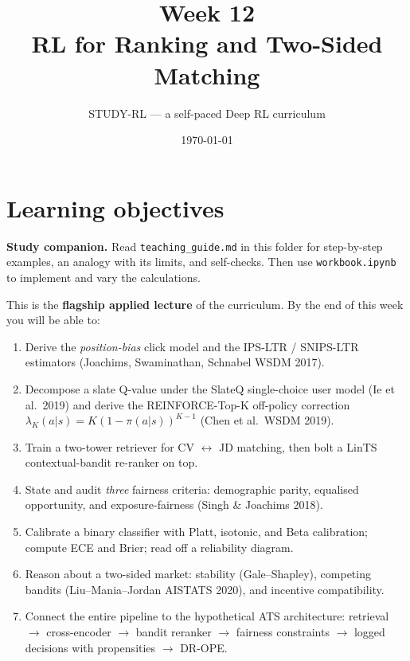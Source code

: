 \documentclass[11pt,oneside]{scrbook}
\title{{\color{rlblue}\textbf{Week 12} \\ \Huge RL for Ranking and Two-Sided Matching}}
\author{STUDY-RL --- a self-paced Deep RL curriculum}
\date{\today}
\begin{document}
\maketitle
\tableofcontents
\newpage

\chapter*{Learning objectives}


\noindent\textbf{Study companion.} Read \texttt{teaching\_guide.md} in this
folder for step-by-step examples, an analogy with its limits, and self-checks.
Then use \texttt{workbook.ipynb} to implement and vary the calculations.
\par\medskip

\begin{keyidea}
This is the \textbf{flagship applied lecture} of the curriculum. By the end of
this week you will be able to:
\begin{enumerate}\setlength\itemsep{2pt}
  \item Derive the \emph{position-bias} click model and the IPS-LTR / SNIPS-LTR
        estimators (Joachims, Swaminathan, Schnabel WSDM 2017).
  \item Decompose a slate Q-value under the SlateQ single-choice user model
        (Ie et al.\ 2019) and derive the REINFORCE-Top-K off-policy correction
        $\lambda_K(a|s) = K(1 - \pi(a|s))^{K-1}$ (Chen et al.\ WSDM 2019).
  \item Train a two-tower retriever for CV $\leftrightarrow$ JD matching, then
        bolt a LinTS contextual-bandit re-ranker on top.
  \item State and audit \emph{three} fairness criteria: demographic parity,
        equalised opportunity, and exposure-fairness (Singh \& Joachims 2018).
  \item Calibrate a binary classifier with Platt, isotonic, and Beta
        calibration; compute ECE and Brier; read off a reliability diagram.
  \item Reason about a two-sided market: stability (Gale--Shapley), competing
        bandits (Liu--Mania--Jordan AISTATS 2020), and incentive compatibility.
  \item Connect the entire pipeline to the hypothetical ATS architecture:
        retrieval $\to$ cross-encoder $\to$ bandit reranker $\to$ fairness
        constraints $\to$ logged decisions with propensities $\to$ DR-OPE.
\end{enumerate}
\end{keyidea}
\end{document}
